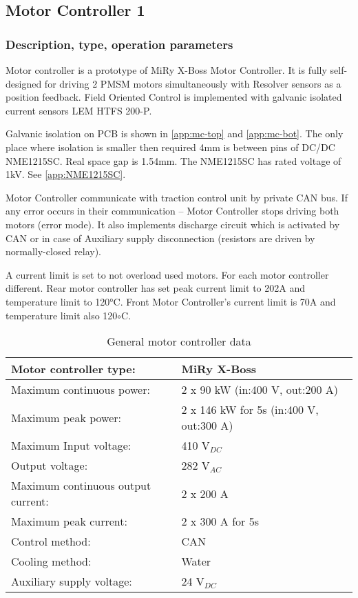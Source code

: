 \subsection{Motor Controller 1}

\subsubsection{Description, type, operation parameters}
Motor controller is a prototype of MiRy X-Boss Motor Controller. It is fully self-designed for driving 2 PMSM motors simultaneously with Resolver sensors as a position feedback. Field Oriented Control is implemented with galvanic isolated current sensors LEM HTFS 200-P.

Galvanic isolation on PCB is shown in \ref{app:mc-top} and \ref{app:mc-bot}. The only place where isolation is smaller then required 4mm is between pins of DC/DC NME1215SC. Real space gap is 1.54mm. The NME1215SC has rated voltage of 1kV. See \ref{app:NME1215SC}.

Motor Controller communicate with traction control unit by private CAN bus. If any error occurs in their communication – Motor Controller stops driving both motors (error mode). It also implements discharge circuit which is activated by CAN or in case of Auxiliary supply disconnection (resistors are driven by normally-closed relay).

A current limit is set to not overload used motors. For each motor controller different. Rear motor controller has set peak current limit to 202A and temperature limit to 120°C. Front Motor Controller’s current limit is 70A and temperature limit also 120$\circ$C.

\begin{table}[H]
	\centering
	\caption{General motor controller data}
	\begin{tabularx}{\textwidth}{|X|X|}\hline
		Motor controller type: & MiRy X-Boss \\[\TableSize]\hline
		Maximum continuous power: & 2 x 90 kW (in:400 V, out:200 A) \\[\TableSize]\hline
		Maximum peak power: & 2 x 146 kW for 5s (in:400 V, out:300 A) \\[\TableSize]\hline
		Maximum Input voltage: & 410 V$_{DC}$ \\[\TableSize]\hline
		Output voltage: & 282 V$_{AC}$ \\[\TableSize]\hline
		Maximum continuous output current: & 2 x 200 A \\[\TableSize]\hline
		Maximum peak current: & 2 x 300 A for 5s \\[\TableSize]\hline
		Control method: & CAN \\[\TableSize]\hline
		Cooling method: & Water \\[\TableSize]\hline
		Auxiliary supply voltage: & 24 V$_{DC}$ \\[\TableSize]\hline
	\end{tabularx}%
	\label{tab:MC:general}%
\end{table}%

